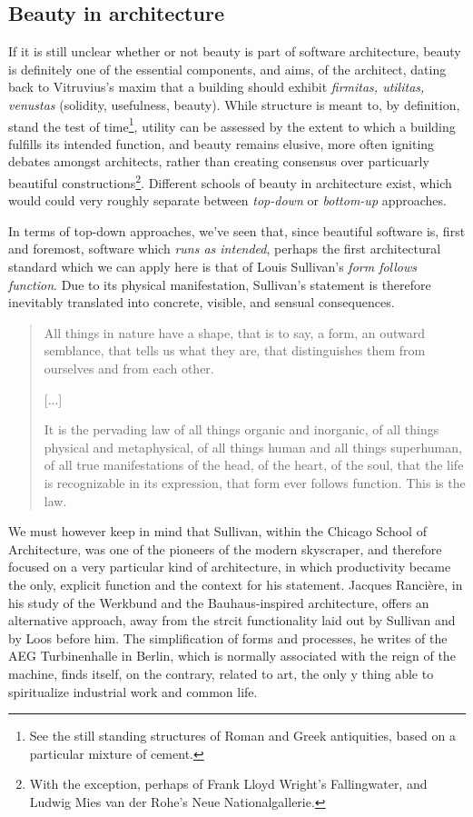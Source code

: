 \documentclass{article}
\begin{document}
\subsection{Beauty in architecture}

If it is still unclear whether or not beauty is part of software architecture, beauty is definitely one of the essential components, and aims, of the architect, dating back to Vitruvius's maxim that a building should exhibit \emph{firmitas, utilitas, venustas} (solidity, usefulness, beauty). While structure is meant to, by definition, stand the test of time\footnote{See the still standing structures of Roman and Greek antiquities, based on a particular mixture of cement.}, utility can be assessed by the extent to which a building fulfills its intended function, and beauty remains elusive, more often igniting debates amongst architects, rather than creating consensus over particuarly beautiful constructions\footnote{With the exception, perhaps of Frank Lloyd Wright's Fallingwater, and Ludwig Mies van der Rohe's Neue Nationalgallerie.}. Different schools of beauty in architecture exist, which would could very roughly separate between \emph{top-down} or \emph{bottom-up} approaches.

In terms of top-down approaches, we've seen that, since beautiful software is, first and foremost, software which \emph{runs as intended}, perhaps the first architectural standard which we can apply here is that of Louis Sullivan's \emph{form follows function}. Due to its physical manifestation, Sullivan's statement is therefore inevitably translated into concrete, visible, and sensual consequences.

\begin{quote}
  All things in nature have a shape, that is to say, a form, an outward semblance, that tells us what they are, that distinguishes them from ourselves and from each other.

  [...]

  It is the pervading law of all things organic and inorganic, of all things physical and metaphysical, of all things human and all things superhuman, of all true manifestations of the head, of the heart, of the soul, that the life is recognizable in its expression, that form ever follows function. This is the law.\cite{sullivan_tall_1896}
\end{quote}

We must however keep in mind that Sullivan, within the Chicago School of Architecture, was one of the pioneers of the modern skyscraper, and therefore focused on a very particular kind of architecture, in which productivity became the only, explicit function and the context for his statement. Jacques Rancière, in his study of the Werkbund and the Bauhaus-inspired architecture, offers an alternative approach, away from the strcit functionality laid out by Sullivan and by Loos before him. The simplification of forms and processes, he writes of the AEG Turbinenhalle in Berlin, which is normally associated with the reign of the machine, finds itself, on the contrary, related to art, the only y thing able to spiritualize industrial work and common life\cite{ranciere_aisthesis_2013}.
\end{document}
